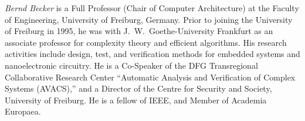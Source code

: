 \documentclass[10pt,twocolumn]{article}
\begin{document}
\medskip

\textit{Bernd Becker} is a Full Professor (Chair of Computer Architecture) at the 
Faculty of Engineering, University of Freiburg, Germany. Prior to joining the 
University of Freiburg in 1995, he was with J.~W.~Goethe-University Frankfurt as 
an associate professor for complexity theory and efficient algorithms. His 
research activities include design, test, and verification methods for embedded 
systems and  nanoelectronic circuitry. He is a Co-Speaker of the DFG 
Transregional Collaborative Research Center ``Automatic Analysis and Verification 
of Complex Systems (AVACS),'' and a Director of the Centre for Security and 
Society, University of Freiburg. He is a fellow of IEEE, and Member of Academia 
Europaea.

\balance
\end{document}
